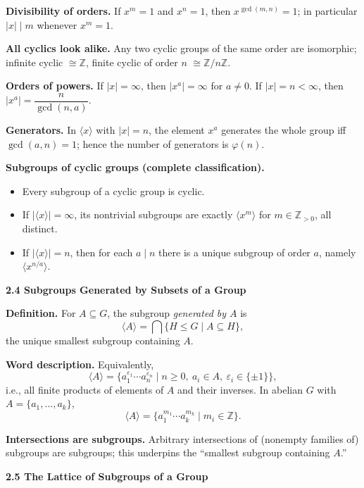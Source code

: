 \documentclass[12pt]{article}
\theoremstyle{definition}
\begin{document}
\medskip
\textbf{Divisibility of orders.} If $x^m=1$ and $x^n=1$, then $x^{\gcd(m,n)}=1$; in particular $|x|\mid m$ whenever $x^m=1$.

\medskip
\textbf{All cyclics look alike.} Any two cyclic groups of the same order are isomorphic; infinite cyclic $\cong\mathbb Z$, finite cyclic of order $n$ $\cong \mathbb Z/n\mathbb Z$.

\medskip
\textbf{Orders of powers.} If $|x|=\infty$, then $|x^a|=\infty$ for $a\ne 0$. If $|x|=n<\infty$, then $|x^a|=\dfrac{n}{\gcd(n,a)}$.

\medskip
\textbf{Generators.} In $\langle x\rangle$ with $|x|=n$, the element $x^a$ generates the whole group iff $\gcd(a,n)=1$; hence the number of generators is $\varphi(n)$.

\medskip
\textbf{Subgroups of cyclic groups (complete classification).}
\begin{itemize}\itemsep3pt
\item Every subgroup of a cyclic group is cyclic.
\item If $|\langle x\rangle|=\infty$, its nontrivial subgroups are exactly $\langle x^m\rangle$ for $m\in\mathbb Z_{>0}$, all distinct.
\item If $|\langle x\rangle|=n$, then for each $a\mid n$ there is a unique subgroup of order $a$, namely $\langle x^{n/a}\rangle$.
\end{itemize}

\newpage

\textbf{2.4 Subgroups Generated by Subsets of a Group}

\newpage

\medskip
\textbf{Definition.} For $A\subseteq G$, the subgroup \emph{generated by $A$} is
\[
\langle A\rangle=\bigcap\{H\le G\mid A\subseteq H\},
\]
the unique smallest subgroup containing $A$.

\medskip
\textbf{Word description.} Equivalently,
\[
\langle A\rangle=\{a_1^{\varepsilon_1}\cdots a_n^{\varepsilon_n}\mid n\ge 0,\ a_i\in A,\ \varepsilon_i\in\{\pm1\}\},
\]
i.e., all finite products of elements of $A$ and their inverses. In abelian $G$ with $A=\{a_1,\dots,a_k\}$,
\[
\langle A\rangle=\{a_1^{m_1}\cdots a_k^{m_k}\mid m_i\in\mathbb Z\}.
\]

\medskip
\textbf{Intersections are subgroups.} Arbitrary intersections of (nonempty families of) subgroups are subgroups; this underpins the “smallest subgroup containing $A$.”

\newpage

\textbf{2.5 The Lattice of Subgroups of a Group}
\end{document}
